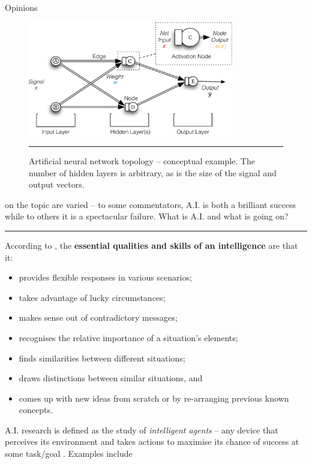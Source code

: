 \newpage\noindent Opinions
\begin{figure}[!t]
\centering
\includegraphics[width=0.8\textwidth]{images/DSML/AIDL3.png} \caption[\small ANN topology]{\small Artificial neural network topology -- conceptual example. The number of hidden layers is arbitrary, as is the size of the signal and output vectors.}\hrule\label{fig:aidl3}
\end{figure}
\afterpage{\FloatBarrier}
 on the topic are varied -- to some commentators, A.I. is both a brilliant success while to others it is a spectacular failure. What is A.I. and what is going on?
\begin{center}\rule{0.5\linewidth}{.4pt}\end{center}
According to \cite{DSML_GEB}, the \textbf{essential qualities and skills of an intelligence} are that it:
\begin{itemize}[noitemsep]
\item provides flexible responses in various scenarios;
\item takes advantage of lucky circumstances;
\item makes sense out of contradictory messages;
\item recognises the relative importance of a situation's elements;
\item finds similarities between different situations;
\item draws distinctions between similar situations, and 
\item comes up with new ideas from scratch or by re-arranging previous known concepts.
\end{itemize}
A.I. research is defined as the study of \textit{intelligent agents} -- any device that perceives its environment and takes actions to maximise its chance of success at some task/goal \cite{DSML_AIW}. Examples include 
